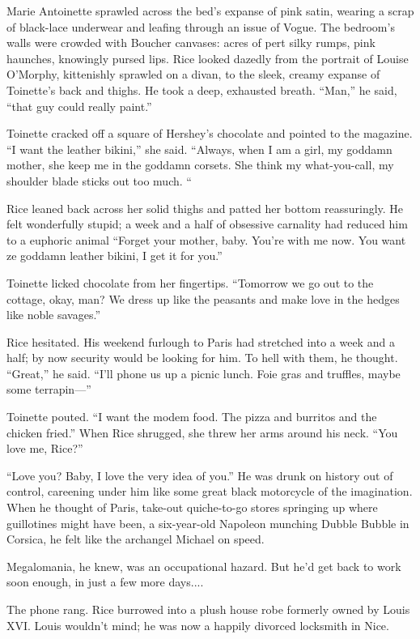 Marie Antoinette sprawled across the bed's expanse of pink satin, wearing a scrap of black-lace underwear and leafing through an issue of Vogue. The bedroom's walls were crowded with Boucher canvases: acres of pert silky rumps, pink haunches, knowingly pursed lips. Rice looked dazedly from the portrait of Louise O'Morphy, kittenishly sprawled on a divan, to the sleek, creamy expanse of Toinette's back and thighs. He took a deep, exhausted breath. ``Man,'' he said, ``that guy could really paint.''

Toinette cracked off a square of Hershey's chocolate and pointed to the magazine. ``I want the leather bikini,'' she said. ``Always, when I am a girl, my goddamn mother, she keep me in the goddamn corsets. She think my what-you-call, my shoulder blade sticks out too much. ``

Rice leaned back across her solid thighs and patted her bottom reassuringly. He felt wonderfully stupid; a week and a half of obsessive carnality had reduced him to a euphoric animal ``Forget your mother, baby. You're with me now. You want ze goddamn leather bikini, I get it for you.''

Toinette licked chocolate from her fingertips. ``Tomorrow we go out to the cottage, okay, man? We dress up like the peasants and make love in the hedges like noble savages.''

Rice hesitated. His weekend furlough to Paris had stretched into a week and a half; by now security would be looking for him. To hell with them, he thought. ``Great,'' he said. ``I'll phone us up a picnic lunch. Foie gras and truffles, maybe some terrapin—''

Toinette pouted. ``I want the modem food. The pizza and burritos and the chicken fried.'' When Rice shrugged, she threw her arms around his neck. ``You love me, Rice?''

``Love you? Baby, I love the very idea of you.'' He was drunk on history out of control, careening under him like some great black motorcycle of the imagination. When he thought of Paris, take-out quiche-to-go stores springing up where guillotines might have been, a six-year-old Napoleon munching Dubble Bubble in Corsica, he felt like the archangel Michael on speed.

Megalomania, he knew, was an occupational hazard. But he'd get back to work soon enough, in just a few more days....

The phone rang. Rice burrowed into a plush house robe formerly owned by Louis XVI. Louis wouldn't mind; he was now a happily divorced locksmith in Nice.


